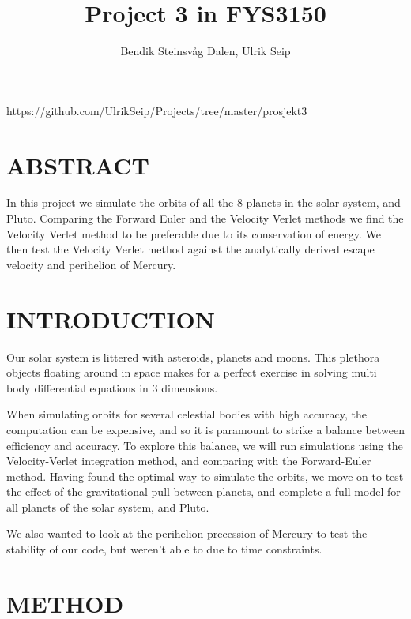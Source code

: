 \documentclass[a4paper]{article}
\title{Project 3 in FYS3150}
\author{Bendik Steinsvåg Dalen, Ulrik Seip}
\begin{document}
	\maketitle
	
	https://github.com/UlrikSeip/Projects/tree/master/prosjekt3
	
	\section{ABSTRACT}
	In this project we simulate the orbits of all the 8 planets in the solar system, and Pluto. Comparing the Forward Euler and the Velocity Verlet methods we find the Velocity Verlet method to be preferable due to its conservation of energy. We then test the Velocity Verlet method against the analytically derived escape velocity and perihelion of Mercury.
	
	\section{INTRODUCTION}
	Our solar system is littered with asteroids, planets and moons. This plethora objects floating around in space makes for a perfect exercise in solving multi body differential equations in 3 dimensions.
	
	When simulating orbits for several celestial bodies with high accuracy, the computation can be expensive, and so it is paramount to strike a balance  between efficiency and accuracy. To explore this balance, we will run simulations using the Velocity-Verlet integration method, and comparing with the Forward-Euler method. Having found the optimal way to simulate the orbits, we move on to test the effect of the gravitational pull between planets, and complete a full model for all planets of the solar system, and Pluto. 
	
	We also wanted to look at the perihelion precession of Mercury to test the stability of our code, but weren't able to due to time constraints.
	
	\section{METHOD}
	
\end{document}
